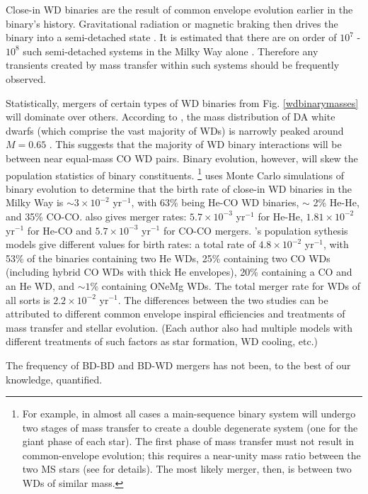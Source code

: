 Close-in WD binaries are the result of common envelope evolution earlier in the binary's history.  Gravitational radiation or magnetic braking then drives the binary into a semi-detached state \citep{motl+07,nele+01}.  It is estimated that there are on order of $10^7$ - $10^8$ such semi-detached systems in the Milky Way alone \citep{motl+07,nele+01,mars11}.  Therefore any transients created by mass transfer within such systems should be frequently observed.

Statistically, mergers of certain types of WD binaries from Fig. \ref{wdbinarymasses} will dominate over others.  According to \cite{tremblay}, the mass distribution of DA white dwarfs (which comprise the vast majority of WDs) is narrowly peaked around $M = 0.65$ \Msun.  This suggests that the majority of WD binary interactions will be between near equal-mass CO WD pairs.  Binary evolution, however, will skew the population statistics of binary constituents.  \footnote{For example, in almost all cases a main-sequence binary system will undergo two stages of mass transfer to create a double degenerate system (one for the giant phase of each star).  The first phase of mass transfer must not result in common-envelope evolution; this requires a near-unity mass ratio between the two MS stars (see \cite{vkercj10} for details).  The most likely merger, then, is between two WDs of similar mass.}  \cite{han98} uses Monte Carlo simulations of binary evolution to determine that the birth rate of close-in WD binaries in the Milky Way is $\sim 3 \times 10^{-2}$ yr$^{-1}$, with 63\% being He-CO WD binaries, $\sim$ 2\% He-He, and 35\% CO-CO.  \citeauthor{han98} also gives merger rates: $5.7 \times 10^{-3}$ yr$^{-1}$ for He-He, $1.81 \times 10^{-2}$ yr$^{-1}$ for He-CO and $5.7 \times 10^{-3}$ yr$^{-1}$ for CO-CO mergers.  \cite{nele+01a}'s population sythesis models give different values for birth rates: a total rate of $4.8 \times 10^{-2}$ yr$^{-1}$, with 53\% of the binaries containing two He WDs, 25\% containing two CO WDs (including hybrid CO WDs with thick He envelopes), 20\% containing a CO and an He WD, and $\sim 1$\% containing ONeMg WDs.  The total merger rate for WDs of all sorts is $2.2 \times 10^{-2}$ yr$^{-1}$.  The differences between the two studies can be attributed to different common envelope inspiral efficiencies and treatments of mass transfer and stellar evolution.  (Each author also had multiple models with different treatments of such factors as star formation, WD cooling, etc.)

The frequency of BD-BD and BD-WD mergers has not been, to the best of our knowledge, quantified.


